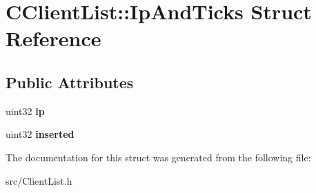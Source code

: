 \section{CClientList::IpAndTicks Struct Reference}
\label{structCClientList_1_1IpAndTicks}
\subsection*{Public Attributes}
\begin{DoxyCompactItemize}
\item 
uint32 {\bfseries ip}\label{structCClientList_1_1IpAndTicks_ac66ade00c36c272e46b13e96751cae1a}

\item 
uint32 {\bfseries inserted}\label{structCClientList_1_1IpAndTicks_a08335d36867d4ec1ae8c0581d43854af}

\end{DoxyCompactItemize}


The documentation for this struct was generated from the following file:\begin{DoxyCompactItemize}
\item 
src/ClientList.h\end{DoxyCompactItemize}
